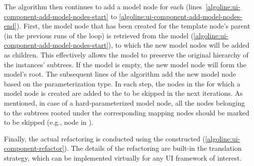 The algorithm then continues to add a model node for each \mappedset
(lines~\ref{algoline:ui-component-add-model-nodes-start} to \ref{algoline:ui-component-add-model-nodes-end}).
First, the model node that has been created for the template \dom node's parent 
(in the previous runs of the loop) is retrieved from the model (\cref{algoline:ui-component-add-model-nodes-start}),
to which the new model nodes will be added as children.
This effectively allows the model to preserve the original hierarchy of the instances' \dom subtrees.
If the model is empty, the new model node will form the model's root.
The subsequent lines of the algorithm add the new model node
based on the parameterization type.
In each step, the \dom nodes in the \mappedset for which a model node is created
are added to the  to be skipped in the next iterations.
As mentioned, in case of a hard-parameterized model node,
all the \dom nodes belonging to the subtrees rooted under the corresponding mapping \dom nodes
should be marked to be skipped (e.g., node  in ).

Finally, the actual refactoring is conducted using the constructed \model (\cref{algoline:ui-component-refactor}).
The details of the refactoring are built-in the translation strategy,
which can be implemented virtually for any UI framework of interest.



